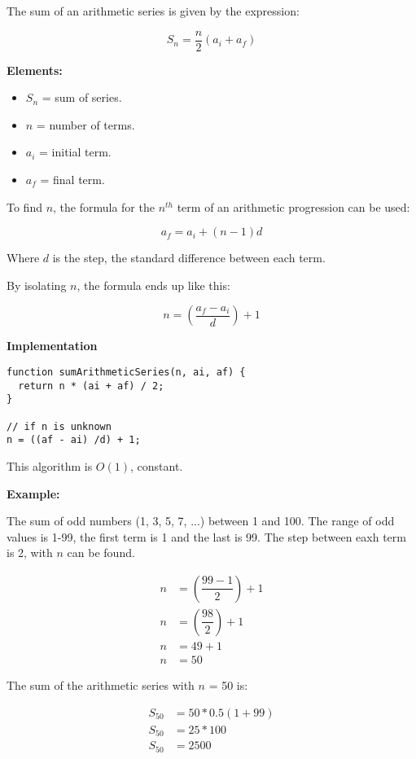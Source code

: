 The sum of an arithmetic series is given by the expression:

\[\boxed{
  S_n = \dfrac{n}{2}\left(a_i+a_f\right)
}\]

\textbf{Elements:}

\begin{itemize}
  \item $S_n$ = sum of series.
  \item $n$ = number of terms.
  \item $a_i$ = initial term.
  \item $a_f$ = final term.
\end{itemize}

To find $n$, the formula for the $n^{th}$ term of an arithmetic progression can be used:

\[\boxed{
  a_f = a_i + (n-1)d
}\]

Where $d$ is the step, the standard difference between each term.

By isolating $n$, the formula ends up like this:

\[\boxed{
  n = \left(\dfrac{a_f-a_i}{d}\right)+1
}\]

\textbf{Implementation}

\begin{lstlisting}[style=general]
function sumArithmeticSeries(n, ai, af) {
  return n * (ai + af) / 2;
}

// if n is unknown
n = ((af - ai) /d) + 1;
\end{lstlisting}

This algorithm is $O(1)$, constant.

\textbf{Example:}

The sum of odd numbers (1, 3, 5, 7, ...) between 1 and 100. The range of odd values is 1-99, the first term is 1 and the last is 99. The step between eaxh term is 2, with $n$ can be found.

\begin{align*}
  n &= \left(\dfrac{99-1}{2}\right)+1 \\
  n &= \left(\dfrac{98}{2}\right)+1 \\
  n &= 49+1 \\
  n &= 50
\end{align*}

The sum of the arithmetic series with $n$ = 50 is:

\begin{align*}
  S_{50} &= 50*0.5\left(1+99\right) \\
  S_{50} &= 25*100 \\
  S_{50} &= 2500
\end{align*}
